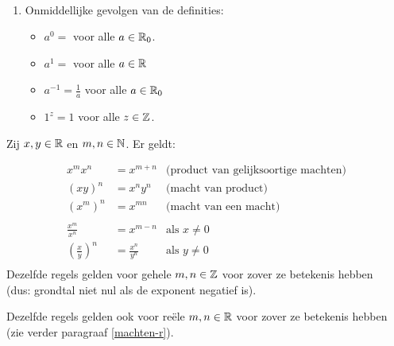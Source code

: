\documentclass{ximera}
\begin{document}

\begin{remark} \ 
	
	\begin{enumerate}
	\item Onmiddellijke gevolgen van de definities:
			\begin{itemize}
			\item $a^0=$ voor alle $a\in\mathbb{R}_0$.
			\item $a^1=$ voor alle $a\in\mathbb{R}$
			\item $a^{-1}=\frac{1}{a}$ voor alle $a\in\mathbb{R}_0$
			\item $1^z=1$ voor alle $z\in\mathbb{Z}$.
		\end{itemize}
\end{enumerate} 
\end{remark}

\begin{proposition}
	Zij $x,y\in\mathbb{R}$ en $m,n\in\mathbb{N}$. Er geldt:

{
	\savebox\strutbox{$\vphantom{\dfrac11^n}$}   %
\begin{align*}
	x^{m}x^{n}  & = x^{m+n}            & \text{(product van gelijksoortige machten)} \\
	(xy)^n      & = x^ny^n             & \text{(macht van product)}\\
	\left(x^{m}\right)^{n} & = x^{mn}  & \text{(macht van een macht)} \\
	\\
	\frac{x^{m}}{x^{n}}    & = x^{m-n} & \text{als }x\neq0\\
	\left(\frac{x}{y}\right)^{n} & = \frac{x^{n}}{y^{n}} & \text{als }y\neq0\\
\end{align*}
	Dezelfde regels gelden voor gehele $m,n\in\mathbb{Z}$ voor zover ze betekenis hebben 
	\\ (dus: grondtal niet nul als de exponent negatief is).
	
	Dezelfde regels gelden ook voor reële $m,n\in\mathbb{R}$ voor zover ze betekenis hebben
	\\ (zie verder paragraaf \ref{machten-r}).
}
\end{proposition}
\end{document}
